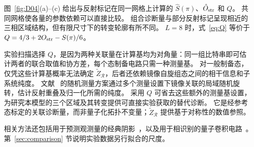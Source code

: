 图~\ref{fig:D04}(a)--(c) 给出与反射标记在同一网格上计算的 $\hat S(\pi)$、$\hat O_{\rm str}$ 和 $Q$。
共同网格使各量的参数依赖可以直接比较。
组合诊断量与部分反射标记呈现相近的三相区域结构，但有限尺寸下的转变轮廓有所不同。
$L=8$ 时，式~\eqref{eq:Q} 等价于 $Q=4/3+2O_{\rm str}-S(\pi)/6$。

实验扫描选择 $Q$，是因为两种关联量在计算基均为对角量：同一组比特串即可估计两者的联合取值和协方差，每个态制备电路只需一种测量基。
对一般制备态，仅凭这些计算基概率无法确定 $\tilde Z_{\mathcal R}$，后者还依赖镜像自旋组态之间的相干信息和子系统纯度。
文献~\cite{elben2020manybody} 的随机测量方案通过多个测量设置下镜像关联的局域随机旋转，估计反射重叠及归一化所需的纯度。
采用 $Q$ 可省去这些额外的测量基设置，为研究本模型的三个区域及其转变提供可直接实验获取的替代诊断。
它是经参考态标定的关联诊断量，而非量子化拓扑不变量；$\tilde Z_{\mathcal R}$ 提供基于对称性的数值参照。

相关方法还包括用于预测观测量的经典阴影~\cite{huang2020predicting}，以及用于相识别的量子卷积电路~\cite{cong2019quantum}。
第~\ref{sec:comparison} 节说明实验数据另行拟合的尺度。

